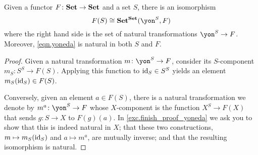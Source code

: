 \documentclass[Book-Poly]{subfiles}
\begin{document}
\begin{lemma}\label{lemma.yoneda}
    Given a functor $F\colon\mathbf{Set}\to\mathbf{Set}$ and a set $S$, there is an isomorphism
    \begin{equation}\label{eqn.yoneda}
        F(S)\iso\smset^\smset(\yon^S,F)
    \end{equation}
    where the right hand side is the set of natural transformations $\yon^S\to F$.
    Moreover, \eqref{eqn.yoneda} is natural in both $S$ and $F$.
\end{lemma}
\begin{proof}[Proof]
    Given a natural transformation $m\colon\yon^S\to F$, consider its $S$-component $m_S\colon S^S\to F(S)$.
    Applying this function to $\mathrm{id}_S\in S^S$ yields an element $m_S(\mathrm{id}_S)\in F(S)$.

    Conversely, given an element $a\in F(S)$, there is a natural transformation we denote by $m^a\colon\yon^S\to F$ whose $X$-component is the function $X^S\to F(X)$ that sends $g\colon S\to X$ to $F(g)(a)$.
    In \cref{exc.finish_proof_yoneda} we ask you to show that this is indeed natural in $X$; that these two constructions, $m\mapsto m_S(\mathrm{id}_S)$ and $a\mapsto m^a$, are mutually inverse; and that the resulting isomorphism is natural.
\end{proof}

\end{document}
